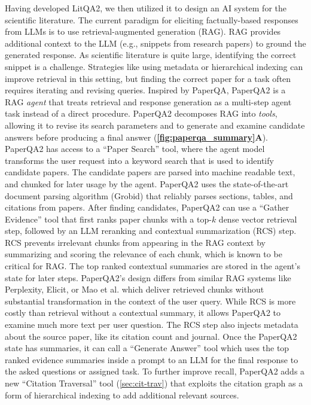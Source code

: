 \documentclass{article}
\begin{document}
\begin{bibunit}[unsrt]
Having developed LitQA2, we then utilized it to design an AI system for the scientific literature. The current paradigm for eliciting factually-based responses from LLMs is to use retrieval-augmented generation (RAG)\cite{lewis2020retrieval, shuster-etal-2021-retrieval-augmentation}. RAG provides additional context to the LLM (e.g., snippets from research papers) to ground the generated response. As scientific literature is quite large, identifying the correct snippet is a challenge. Strategies like using metadata or hierarchical indexing can improve retrieval in this setting\cite{gao2023chatrec}, but finding the correct paper for a task often requires iterating and revising queries. Inspired by PaperQA\cite{lala2023paperqa}, PaperQA2 is a RAG \textit{agent} that treats retrieval and response generation as a multi-step agent task\cite{karpas2022mrkl} instead of a direct procedure. PaperQA2 decomposes RAG into \textit{tools}, allowing it to revise its search parameters and to generate and examine candidate answers before producing a final answer (\textbf{\autoref{fig:paperqa_summary}A}). PaperQA2 has access to a ``Paper Search'' tool, where the agent model transforms the user request into a keyword search that is used to identify candidate papers. The candidate papers are parsed into machine readable text, and chunked for later usage by the agent. PaperQA2 uses the state-of-the-art document parsing algorithm (Grobid\cite{GROBID}) that reliably parses sections, tables, and citations from papers. After finding candidates, PaperQA2 can use a ``Gather Evidence'' tool that first ranks paper chunks with a top-$k$ dense vector retrieval step, followed by an LLM reranking and contextual summarization (RCS) step. RCS prevents irrelevant chunks from appearing in the RAG context by summarizing and scoring the relevance of each chunk, which is known to be critical for RAG\cite{shi2023large}. The top ranked contextual summaries are stored in the agent's state for later steps. PaperQA2's design differs from similar RAG systems like Perplexity\cite{perplexity}, Elicit\cite{elicit}, or Mao et al.\cite{mao2020generation} which deliver retrieved chunks without substantial transformation in the context of the user query. While RCS is more costly than retrieval without a contextual summary, it allows PaperQA2 to examine much more text per user question. The RCS step also injects metadata about the source paper, like its citation count and journal. Once the PaperQA2 state has summaries, it can call a ``Generate Answer'' tool which uses the top ranked evidence summaries inside a prompt to an LLM for the final response to the asked questions or assigned task. To further improve recall, PaperQA2 adds a new ``Citation Traversal'' tool (\autoref{sec:cit-trav}) that exploits the citation graph as a form of hierarchical indexing to add additional relevant sources. 


\end{bibunit}
\end{document}
